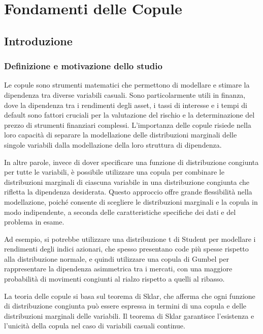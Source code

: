 \documentclass[%
	corpo=11pt,
    twoside,
    stile=classica,
    oldstyle,
    tipotesi=custom,
    greek,
    evenboxes,
]{toptesi}
\begin{document}

\mainmatter

\part{Fondamenti delle Copule}

\chapter{Introduzione}

\section{Definizione e motivazione dello studio}
Le copule sono strumenti matematici che permettono di modellare e stimare la dipendenza tra diverse variabili casuali. Sono particolarmente utili in finanza, dove la dipendenza tra i rendimenti degli asset, i tassi di interesse e i tempi di default sono fattori cruciali per la valutazione del rischio e la determinazione del prezzo di strumenti finanziari complessi. L’importanza delle copule risiede nella loro capacità di separare la modellazione delle distribuzioni marginali delle singole variabili dalla modellazione della loro struttura di dipendenza.

In altre parole, invece di dover specificare una funzione di distribuzione congiunta per tutte le variabili, è possibile utilizzare una copula per combinare le distribuzioni marginali di ciascuna variabile in una distribuzione congiunta che rifletta la dipendenza desiderata. Questo approccio offre grande flessibilità nella modellazione, poiché consente di scegliere le distribuzioni marginali e la copula in modo indipendente, a seconda delle caratteristiche specifiche dei dati e del problema in esame.

Ad esempio, si potrebbe utilizzare una distribuzione t di Student per modellare i rendimenti degli indici azionari, che spesso presentano code più spesse rispetto alla distribuzione normale, e quindi utilizzare una copula di Gumbel per rappresentare la dipendenza asimmetrica tra i mercati, con una maggiore probabilità di movimenti congiunti al rialzo rispetto a quelli al ribasso.

La teoria delle copule si basa sul teorema di Sklar, che afferma che ogni funzione di distribuzione congiunta può essere espressa in termini di una copula e delle distribuzioni marginali delle variabili. Il teorema di Sklar garantisce l’esistenza e l’unicità della copula nel caso di variabili casuali continue. 
\end{document}
